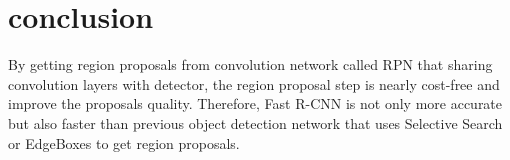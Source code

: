 \documentclass[extendedabs]{bmvc2k}
\begin{document}
\section{conclusion}
By getting region proposals from convolution network called RPN that sharing convolution layers with detector, the region proposal step is nearly cost-free and improve the proposals quality.
Therefore, Fast R-CNN is not only more accurate but also faster than previous object detection network that uses Selective Search\cite{selsearch} or EdgeBoxes\cite{edgebox} to get region proposals.
\newpage

\end{document}
